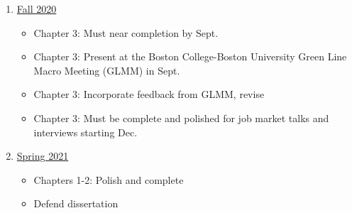 \documentclass[11pt]{article}
\renewcommand{\[}{\begin{equation}}
\renewcommand{\]}{\end{equation}}
\begin{document}
\begin{enumerate}
\item[]{\underline{Fall 2020}} 
\vspace{-0.2cm}
\begin{itemize}
\item Chapter 3: Must near completion by Sept. 
\item Chapter 3: Present at the Boston College-Boston University Green Line Macro Meeting (GLMM) in Sept.
\item Chapter 3: Incorporate feedback from GLMM, revise
\item Chapter 3: Must be complete and polished for job market talks and interviews starting Dec.
\end{itemize}
\item[]{\underline{Spring 2021}} 
\vspace{-0.2cm}
\begin{itemize}
\item Chapters 1-2: Polish and complete
\item Defend dissertation
\end{itemize}
\end{enumerate}


\newpage


\nocite{*}
\end{document}
